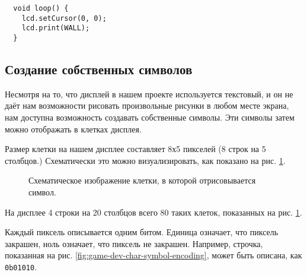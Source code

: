 \documentclass[../sparc.tex]{subfiles}
\begin{document}
\begin{verbatim}
  void loop() {
    lcd.setCursor(0, 0);
    lcd.print(WALL);
  }
\end{verbatim}

\subsection{Создание собственных символов}

Несмотря на то, что дисплей в нашем проекте используется текстовый, и он не даёт
нам возможности рисовать произвольные рисунки в любом месте экрана, нам доступна
возможность создавать собственные символы.  Эти символы затем можно отображать в
клетках дисплея.

Размер клетки на нашем дисплее составляет 8х5 пикселей (8 строк на 5 столбцов.)
Схематически это можно визуализировать, как показано на
рис. \ref{fig:game-dev-char}.

\begin{figure}[ht]
  \centering
  \caption{Схематическое изображение клетки, в которой отрисовывается символ.}
  \label{fig:game-dev-char}
\end{figure}

На дисплее 4 строки на 20 столбцов всего 80 таких клеток, показанных на рис.
\ref{fig:game-dev-char}.

Каждый пиксель описывается одним битом. Единица означает, что пиксель закрашен,
ноль означает, что пиксель не закрашен. Например, строчка, показанная на рис.
\ref{fig:game-dev-char-symbol-encoding}, может быть описана, как
\texttt{0b01010}.

\end{document}
